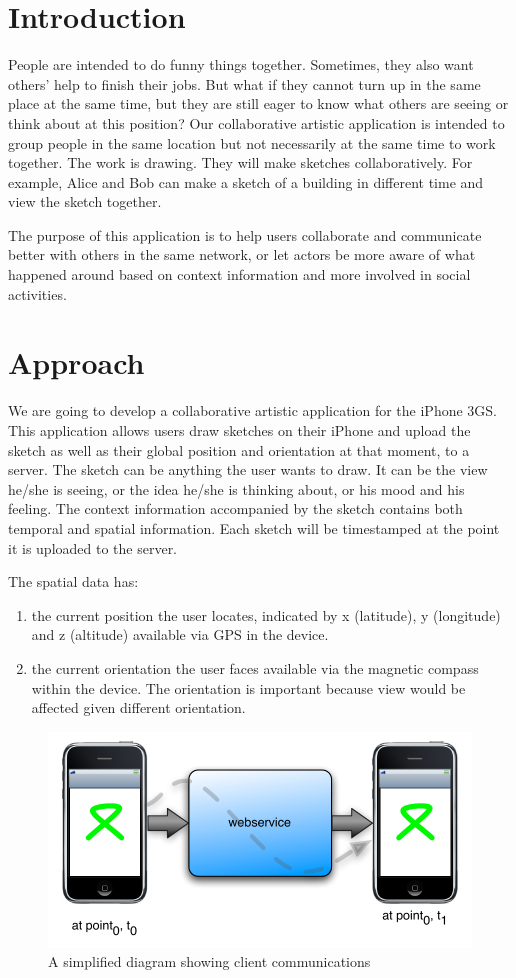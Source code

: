 \documentclass{chi2009}
\begin{document}
\section{Introduction}
People are intended to do funny things together. Sometimes, they also want others' help to finish their jobs. But what if they cannot turn up in the same place at the same time, but they are still eager to know what others are seeing or think about at this position? Our collaborative artistic application is intended to group people in the same location but not necessarily at the same time to work together. The work is drawing. They will make sketches collaboratively. For example, Alice and Bob can make a sketch of a building in different time and view the sketch together.

The purpose of this application is to help users collaborate and communicate better with others in the same network, or let actors be more aware of what happened around based on context information and more involved in social activities. 

\section{Approach}
We are going to develop a collaborative artistic application for the iPhone 3GS. This application allows users draw sketches on their iPhone and upload the sketch as well as their global position and orientation at that moment, to a server. The sketch can be anything the user wants to draw. It can be the view he/she is seeing, or the idea he/she is thinking about, or his mood and his feeling. The context information accompanied by the sketch contains both temporal and spatial information. Each sketch will be timestamped at the point it is uploaded to the server.

The spatial data has:
\begin{enumerate}
\item the current position the user locates, indicated by x (latitude), y
	(longitude) and z (altitude) available via GPS in the device.
\item the current orientation the user faces available via the magnetic compass
	within the device.  The orientation is important because view would be affected given different
         orientation.
\end{enumerate}



\begin{figure}
\centering
\includegraphics[width=.45\textwidth]{arch.pdf}
\caption{A simplified diagram showing client communications}
\label{fig:arch}
\end{figure}
\end{document}
